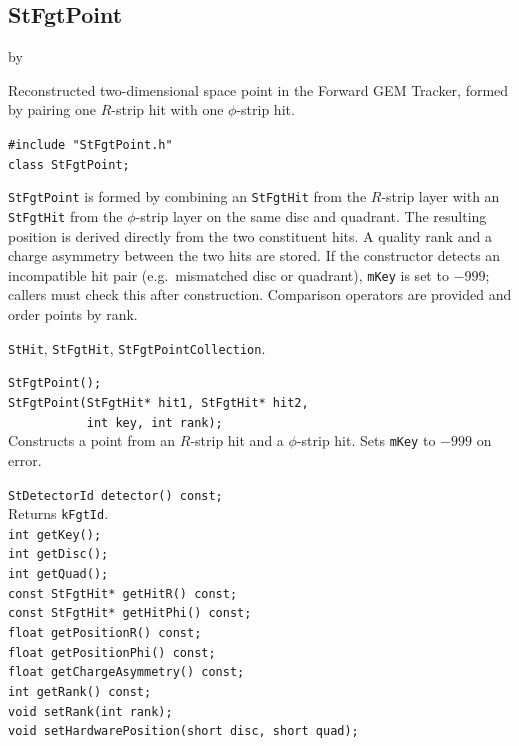 \documentclass[twoside]{article}
\newcommand{\entrylabel}[1]{\mbox{\textbf{{#1}}}\hfil}%
\newenvironment{entry}
{\begin{list}{}%
    {\renewcommand{\makelabel}{\entrylabel}%
     \setlength{\labelwidth}{90pt}%
     \setlength{\leftmargin}{\labelwidth}
     \advance\leftmargin by \labelsep%
      }%
    }%
  {\end{list}}
\newcommand{\Entrylabel}[1]%
{\raisebox{0pt}[1ex][0pt]{\makebox[\labelwidth][l]%
    {\parbox[t]{\labelwidth}{\hspace{0pt}\textbf{{#1}}}}}}
\newenvironment{Entry}%
{\renewcommand{\entrylabel}{\Entrylabel}\begin{entry}}%
  {\end{entry}}
\begin{document}
\subsection{StFgtPoint}
\label{sec:StFgtPoint}
\begin{Entry}
\item[Summary] Reconstructed two-dimensional space point in the Forward GEM Tracker,
  formed by pairing one $R$-strip hit with one $\phi$-strip hit.
\item[Synopsis]
    \verb+#include "StFgtPoint.h"+\\
    \verb+class StFgtPoint;+\\
\item[Description]
  \texttt{StFgtPoint} is formed by combining an \texttt{StFgtHit} from the $R$-strip layer
  with an \texttt{StFgtHit} from the $\phi$-strip layer on the same disc and quadrant.
  The resulting position is derived directly from the two constituent hits.  A quality rank
  and a charge asymmetry between the two hits are stored.  If the constructor detects an
  incompatible hit pair (e.g.\ mismatched disc or quadrant), \texttt{mKey} is set to
  $-999$; callers must check this after construction.  Comparison operators are provided
  and order points by rank.
\item[Related Classes]
  \texttt{StHit}, \texttt{StFgtHit}, \texttt{StFgtPointCollection}.
\item[Public\\ Constructors]
    \verb+StFgtPoint();+\\
    \verb+StFgtPoint(StFgtHit* hit1, StFgtHit* hit2,+\\
    \verb+           int key, int rank);+\\
    Constructs a point from an $R$-strip hit and a $\phi$-strip hit.  Sets \texttt{mKey}
    to $-999$ on error.
\item[Public Member\\ Functions]
    \verb+StDetectorId detector() const;+\\
    Returns \texttt{kFgtId}.\\[2pt]
    \verb+int getKey();+\\
    \verb+int getDisc();+\\
    \verb+int getQuad();+\\
    \verb+const StFgtHit* getHitR() const;+\\
    \verb+const StFgtHit* getHitPhi() const;+\\
    \verb+float getPositionR() const;+\\
    \verb+float getPositionPhi() const;+\\
    \verb+float getChargeAsymmetry() const;+\\
    \verb+int getRank() const;+\\
    \verb+void setRank(int rank);+\\
    \verb+void setHardwarePosition(short disc, short quad);+\\
\end{Entry}
\clearpage
\end{document}
